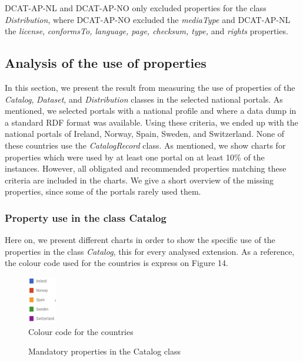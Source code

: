 \documentclass[<options>]{elsarticle}
\begin{document}
DCAT-AP-NL and DCAT-AP-NO only excluded properties for the class \textit{Distribution}, where DCAT-AP-NO excluded the \textit{mediaType} and DCAT-AP-NL the \textit{license}, \textit{conformsTo, language, page, checksum, type, } and \textit{rights} properties.

\subsection{Analysis of the use of properties}
In this section, we present the result from measuring the use of properties of the \textit{Catalog}, \textit{Dataset}, and \textit{Distribution} classes in the selected national portals. As mentioned, we selected portals with a national profile and where a data dump in a standard RDF format was available. Using these criteria, we ended up with the national portals of Ireland, Norway, Spain, Sweden, and Switzerland. None of these countries use the \textit{CatalogRecord} class. As mentioned, we show charts for properties which were used by at least one portal on at least 10\% of the instances. However, all obligated and recommended properties matching these criteria are included in the charts. We give a short overview of the missing properties, since some of the portals rarely used them.

\subsubsection{Property use in the class Catalog}
Here on, we present different charts in order to show the specific use of the properties in the class \textit{Catalog}, this for every analysed extension.
As a reference, the colour code used for the countries is express on Figure 14.

\begin{figure}[H]
\includegraphics{replace3.png}
\caption{Colour code for the countries}
\end{figure}

\begin{figure}[H]
\caption{Mandatory properties in the Catalog class}
\end{figure}
\end{document}
